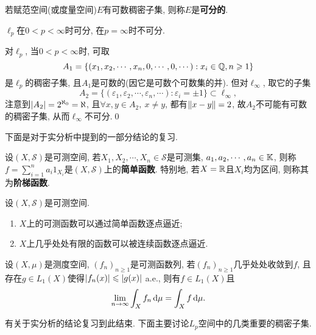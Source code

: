 	\begin{Definition}[可分性]
	若赋范空间(或度量空间)$ E $有可数稠密子集, 则称$ E $是\textbf{可分的}.
	\end{Definition}
	
	\begin{Proposition}
	$ \ell_p $在$ 0<p<\infty $时可分, 在$ p=\infty $时不可分.
	\end{Proposition}
	\begin{Proof}
	对$ \ell_p $, 当$ 0<p<\infty $时, 可取
	\[
	A_1=\{ (x_1,x_2,\cdots,x_n,0,\cdots,0,\cdots) : x_i\in\mathbb{Q}, n\geqslant 1 \}
	\]
	是$ \ell_p $的稠密子集, 且$ A_1 $是可数的(因它是可数个可数集的并). 但对$ \ell_\infty $, 取它的子集
	\[
	A_2=\{ (\varepsilon_1,\varepsilon_2,\cdots,\varepsilon_n,\cdots) : \varepsilon_i=\pm 1 \}\subset\ell_\infty,
	\]
	注意到$ \left| A_2 \right| =2^{\aleph_0}=\aleph $, 且$ \forall x,y\in A_2,\ x\ne y $, 都有$ \left\| x-y \right\|=2 $, 故$ A_2 $不可能有可数的稠密子集, 从而$ \ell_\infty $不可分.\qed
	\end{Proof}
	
	下面是对于实分析中提到的一部分结论的复习.
	
	\begin{Definition}[简单函数]
	设$ (X,\mathcal S) $是可测空间, 若$ X_1,X_2,\cdots,X_n\in\mathcal S $是可测集, $ a_1,a_2,\cdots,a_n\in\mathbb{K} $, 则称$ f=\sum\limits_{i=1}^na_i1_{X_i} $是$ (X,\mathcal S) $上的\textbf{简单函数}. 特别地, 若$ X=\mathbb{R} $且$ X_i $均为区间, 则称其为\textbf{阶梯函数}.
	\end{Definition}
	
	\begin{Proposition}
	设$ (X,\mathcal S) $是可测空间.
	\begin{enumerate}[(1)]
	\item $ X $上的可测函数可以通过简单函数逐点逼近;
	\item $ X $上几乎处处有限的函数可以被连续函数逐点逼近.
	\end{enumerate}
	\end{Proposition}
	
	\begin{Theorem}[Lebesgue控制收敛定理]
	设$ (X,\mu) $是测度空间, $ (f_n)_{n\geqslant 1} $是可测函数列, 若$ (f_n)_{n\geqslant 1} $几乎处处收敛到$ f $, 且存在$ g\in L_1(X) $使得$ \left| f_n(x) \right| \leqslant\left| g(x) \right|  $ a.e., 则有$ f\in L_1(X) $且
	\[
	\lim_{n\to\infty}\int_Xf_n\,\mathrm{d}\mu=\int_Xf\,\mathrm{d}\mu.
	\]
	\end{Theorem}
	
	有关于实分析的结论复习到此结束. 下面主要讨论$ L_p $空间中的几类重要的稠密子集.
	
